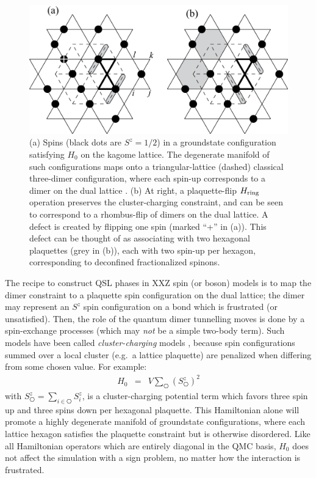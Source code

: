 \documentclass[range]{ar2e}
\begin{document}
\begin{figure}
\includegraphics[width=6in]{kagome}
  \caption{ (a) Spins (black dots are $S^z = 1/2$) in a groundstate configuration satisfying $H_0$ on the kagome lattice.  The degenerate manifold of such configurations maps onto a triangular-lattice (dashed) classical three-dimer configuration, where each spin-up corresponds to a dimer on the dual lattice \cite{BFG}.  (b) At right, a plaquette-flip $H_{\rm ring}$ operation preserves the cluster-charging constraint, and can be seen to correspond to a rhombus-flip of dimers on the dual lattice.  A defect is created by flipping one spin (marked ``+'' in (a)).  This defect can be thought of as associating with two hexagonal plaquettes (grey in (b)), each with two spin-up per hexagon, corresponding to deconfined fractionalized spinons.} \label{kag_fig}
\end{figure}

The recipe to construct QSL phases in XXZ spin (or boson) models is to map the dimer constraint to a plaquette spin configuration on the dual lattice; the dimer may represent an $S^z$ spin configuration on a bond which is frustrated (or unsatisfied).  Then, the role of the quantum dimer tunnelling moves is done by a spin-exchange processes (which may {\it not} be a simple two-body term).  Such models have been called
{\it cluster-charging} models \cite{Isakov2}, because spin configurations summed over a local cluster (e.g.~a lattice plaquette) are penalized when differing from some chosen value.  For example:
\begin{eqnarray}
H_0 &=& V \sum_{\hexagon} (S^z_{\hexagon})^2 
\end{eqnarray}
with $S^z_{\hexagon} = \sum_{i \in \hexagon}S^z_i$,
is a cluster-charging potential term which favors three spin up and three spins down per hexagonal plaquette.  This Hamiltonian alone will promote a highly degenerate manifold of groundstate configurations, where each lattice hexagon satisfies the plaquette constraint but is otherwise disordered.  
Like all Hamiltonian operators which are entirely diagonal in the QMC basis, $H_0$ does not affect the simulation with a sign problem, no matter how the interaction is frustrated.
\end{document}
